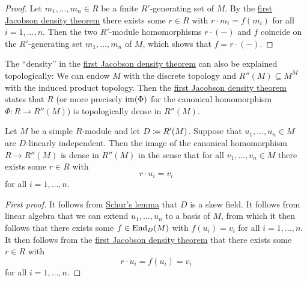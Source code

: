 \begin{proof}
  Let $m_1, \dotsc, m_n \in R$ be a finite $R'$-generating set of $M$.
  By the \hyperref[theorem: first jacobson density theorem]{first Jacobson density theorem} there exists some $r \in R$ with $r \cdot m_i = f(m_i)$ for all $i = 1, \dotsc, n$.
  Then the two $R'$-module homomorphisms $r \cdot (-)$ and $f$ coincide on the $R'$-generating set $m_1, \dotsc, m_n$ of $M$, which shows that $f = r \cdot (-)$.
\end{proof}


\begin{remark}
  The \enquote{density} in the \hyperref[theorem: first jacobson density theorem]{first Jacobson density theorem} can also be explained topologically:
  We can endow $M$ with the discrete topology and $R''(M) \subseteq M^M$ with the induced product topology.
  Then the \hyperref[theorem: first jacobson density theorem]{first Jacobson density theorem} states that $R$ (or more precisely $\operatorname{im}(\Phi)$ for the canonical homomorphism $\Phi \colon R \to R''(M)$) is topologically dense in $R''(M)$.
\end{remark}


\begin{theorem}
  \label{theorem: second jacobson density theorem}
  Let $M$ be a simple $R$-module and let $D \coloneqq R'(M)$.
  Suppose that $u_1, \dotsc, u_n \in M$ are $D$-linearly independent.
  Then the image of the canonical homomorphism $R \to R''(M)$ is dense in $R''(M)$ in the sense that for all $v_1, \dotsc, v_n \in M$ there exists some $r \in R$ with
  \[
    r \cdot u_i = v_i
  \]
  for all $i = 1, \dotsc, n$.
\end{theorem}


\begin{proof}[First proof]
  It follows from \hyperref[proposition: schurs lemma for modules]{Schur’s lemma} that $D$ is a skew field.
  It follows from linear algebra that we can extend $u_1, \dotsc, u_n$ to a basis of $M$, from which it then follows that there exists some $f \in \operatorname{End}_D(M)$ with $f(u_i) = v_i$ for all $i = 1, \dotsc, n$.
  It then follows from the \hyperref[theorem: first jacobson density theorem]{first Jacobson density theorem} that there exists some $r \in R$ with
  \[
      r \cdot u_i
    = f(u_i)
    = v_i
  \]
  for all $i = 1, \dotsc, n$.
\end{proof}


